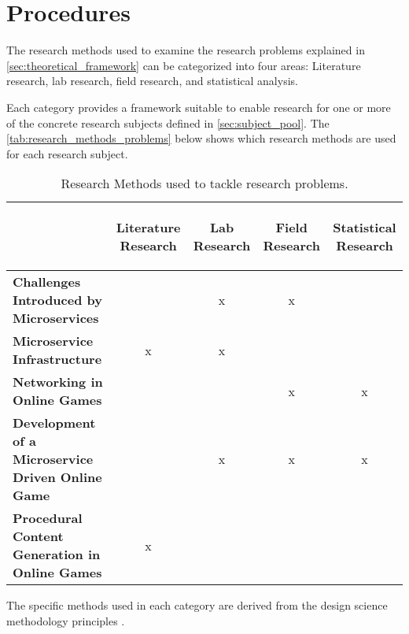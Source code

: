 \section{Procedures}

The research methods used to examine the research problems explained in
\autoref{sec:theoretical_framework} can be categorized into four areas:
Literature research, lab research, field research, and statistical analysis.

Each category provides a framework suitable to enable research for one or more
of the concrete research subjects defined in \autoref{sec:subject_pool}. The
\autoref{tab:research_methods_problems} below shows which research methods are
used for each research subject.

\begin{table}

	\begin{center}
	  \begin{tabular}{ l | c | c | c | c | }
	  
	  	&\begin{turn}{90}\textbf{Literature Research}\end{turn}
	  	&\begin{turn}{90}\textbf{Lab Research}\end{turn}
	  	&\begin{turn}{90}\textbf{Field Research}\end{turn}
	  	&\begin{turn}{90}\textbf{Statistical Research}\end{turn}
	  	\\\hline
	    
	    \textbf{Challenges Introduced by Microservices}&&x&x&\\\hline
	    \textbf{Microservice Infrastructure}&x&x&&\\\hline
	    \textbf{Networking in Online Games}&&&x&x\\\hline
	    \textbf{Development of a Microservice Driven Online Game}&&x&x&x\\\hline
	    \textbf{Procedural Content Generation in Online Games}&x&&&\\\hline
	  \end{tabular}
	\end{center}
	\caption{Research Methods used to tackle research problems.}
	\label{tab:research_methods_problems}
\end{table}
The specific methods used in each category are derived from the design
science methodology principles \cite{wieringa2014design_science}.

